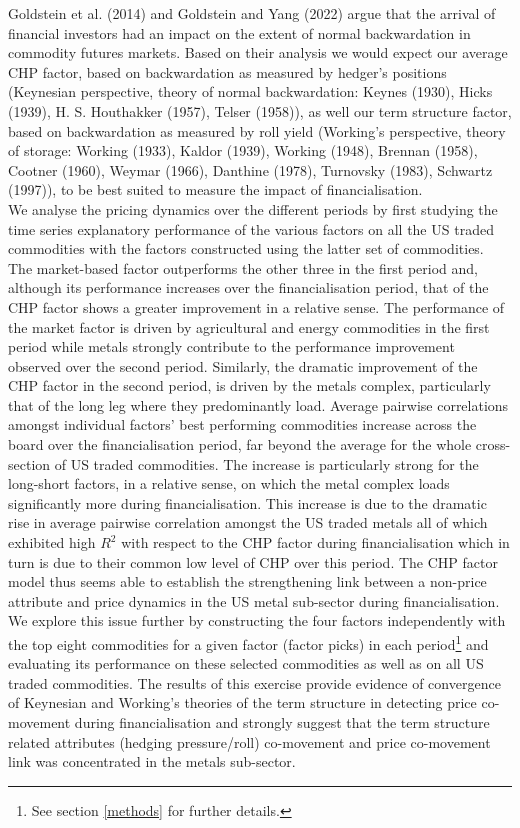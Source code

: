 \documentclass[]{elsarticle} %
\begin{document}
Goldstein et al. (2014) and Goldstein and Yang (2022) argue that the arrival of financial investors had an impact on the extent of normal backwardation in commodity futures markets. Based on their analysis we would expect our average CHP factor, based on backwardation as measured by hedger's positions (Keynesian perspective, theory of normal backwardation: Keynes (1930), Hicks (1939), H. S. Houthakker (1957), Telser (1958)), as well our term structure factor, based on backwardation as measured by roll yield (Working's perspective, theory of storage: Working (1933), Kaldor (1939), Working (1948), Brennan (1958), Cootner (1960), Weymar (1966), Danthine (1978), Turnovsky (1983), Schwartz (1997)), to be best suited to measure the impact of financialisation.\\
We analyse the pricing dynamics over the different periods by first studying the time series explanatory performance of the various factors on all the US traded commodities with the factors constructed using the latter set of commodities. The market-based factor outperforms the other three in the first period and, although its performance increases over the financialisation period, that of the CHP factor shows a greater improvement in a relative sense. The performance of the market factor is driven by agricultural and energy commodities in the first period while metals strongly contribute to the performance improvement observed over the second period. Similarly, the dramatic improvement of the CHP factor in the second period, is driven by the metals complex, particularly that of the long leg where they predominantly load. Average pairwise correlations amongst individual factors' best performing commodities increase across the board over the financialisation period, far beyond the average for the whole cross-section of US traded commodities. The increase is particularly strong for the long-short factors, in a relative sense, on which the metal complex loads significantly more during financialisation. This increase is due to the dramatic rise in average pairwise correlation amongst the US traded metals all of which exhibited high \(R^{2}\) with respect to the CHP factor during financialisation which in turn is due to their common low level of CHP over this period. The CHP factor model thus seems able to establish the strengthening link between a non-price attribute and price dynamics in the US metal sub-sector during financialisation.\\
We explore this issue further by constructing the four factors independently with the top eight commodities for a given factor (factor picks) in each period\footnote{See section \ref{methods} for further details.} and evaluating its performance on these selected commodities as well as on all US traded commodities. The results of this exercise provide evidence of convergence of Keynesian and Working's theories of the term structure in detecting price co-movement during financialisation and strongly suggest that the term structure related attributes (hedging pressure/roll) co-movement and price co-movement link was concentrated in the metals sub-sector.
\end{document}

